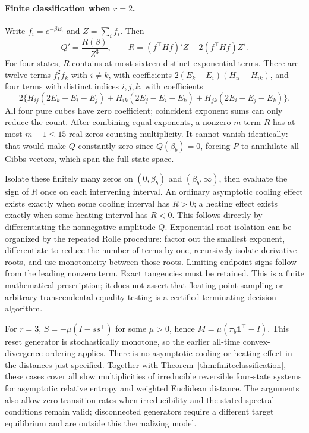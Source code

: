 \paragraph{Finite classification when $r=2$.}
Write $f_i=e^{-\beta E_i}$ and $Z=\sum_i f_i$. Then
\[
Q'=\frac{R(\beta)}{Z^3},\qquad
R=(f^\top Hf)'Z-2(f^\top Hf)Z'.
\]
For four states, $R$ contains at most sixteen distinct exponential terms.
There are twelve terms $f_i^2f_k$ with $i\ne k$, with coefficients
$2(E_k-E_i)(H_{ii}-H_{ik})$, and four terms with distinct indices $i,j,k$,
with coefficients
\[
2\{H_{ij}(2E_k-E_i-E_j)+H_{ik}(2E_j-E_i-E_k)
+H_{jk}(2E_i-E_j-E_k)\}.
\]
All four pure cubes have zero coefficient; coincident exponent sums can only
reduce the count. After combining equal exponents, a nonzero $m$-term $R$
has at most $m-1\leq15$ real zeros counting multiplicity. It cannot vanish
identically: that would make $Q$ constantly zero since $Q(\beta_b)=0$, forcing
$P$ to annihilate all Gibbs vectors, which span the full state space.

Isolate these finitely many zeros on $(0,\beta_b)$ and $(\beta_b,\infty)$,
then evaluate the sign of $R$ once on each intervening interval. An ordinary
asymptotic cooling effect exists exactly when some cooling interval has $R>0$;
a heating effect exists exactly when some heating interval has $R<0$.
This follows directly by differentiating the nonnegative amplitude $Q$.
Exponential root isolation can be organized by the repeated Rolle procedure:
factor out the smallest exponent, differentiate to reduce the number of terms
by one, recursively isolate derivative roots, and use monotonicity between
those roots. Limiting endpoint signs follow from the leading nonzero term.
Exact tangencies must be retained. This is a finite mathematical prescription;
it does not assert that floating-point sampling or arbitrary transcendental
equality testing is a certified terminating decision algorithm.

For $r=3$, $S=-\mu(I-ss^\top)$ for some $\mu>0$, hence
$M=\mu(\pi_b\mathbf1^\top-I)$. This reset generator is stochastically monotone,
so the earlier all-time convex-divergence ordering applies. There is no
asymptotic cooling or heating effect in the distances just specified.
Together with Theorem~\ref{thm:finiteclassification}, these cases cover all
slow multiplicities of irreducible reversible four-state systems for
asymptotic relative entropy and weighted Euclidean distance. The arguments
also allow zero transition rates when irreducibility and the stated spectral
conditions remain valid; disconnected generators require a different target
equilibrium and are outside this thermalizing model.
